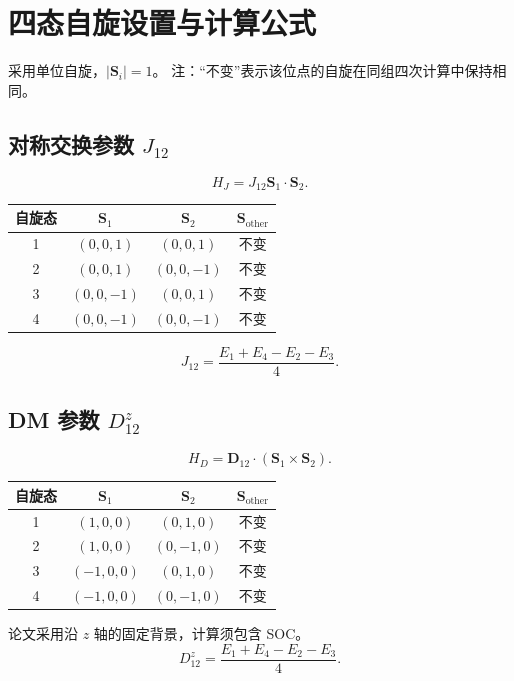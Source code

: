 \documentclass[openany]{book}
\theoremstyle{mydefinition}
\theoremstyle{myplain}
\renewcommand{\arraystretch}{1.4}
\newcommand{\Sother}{\mathbf S_{\mathrm{other}}}
\begin{document}
\clearpage
\begingroup
\renewcommand{\arraystretch}{1.12}
\setlength{\abovedisplayskip}{5pt}
\setlength{\belowdisplayskip}{5pt}
\setlength{\abovedisplayshortskip}{3pt}
\setlength{\belowdisplayshortskip}{3pt}
\setlength{\topsep}{3pt}
\titlespacing*{\subsection}{0pt}{0.4em}{0.2em}
\noindent\begin{minipage}{\textwidth}
\section{四态自旋设置与计算公式}

采用单位自旋，\(|\mathbf S_i|=1\)。
注：“不变”表示该位点的自旋在同组四次计算中保持相同。

\noindent\begin{minipage}{\textwidth}
\subsection{对称交换参数 \(J_{12}\)}
\[
H_J=J_{12}\mathbf S_1\cdot\mathbf S_2.
\]
\begin{center}
\begin{tabular}{cccc}
\toprule
自旋态 & \(\mathbf S_1\) & \(\mathbf S_2\) & \(\Sother\) \\ \midrule
1 & \((0,0,1)\)  & \((0,0,1)\)  & 不变 \\
2 & \((0,0,1)\)  & \((0,0,-1)\) & 不变 \\
3 & \((0,0,-1)\) & \((0,0,1)\)  & 不变 \\
4 & \((0,0,-1)\) & \((0,0,-1)\) & 不变 \\
\bottomrule
\end{tabular}
\end{center}
\[
J_{12}=\frac{E_1+E_4-E_2-E_3}{4}.
\]
\end{minipage}
\par\medskip

\noindent\begin{minipage}{\textwidth}
\subsection{DM 参数 \(D_{12}^{z}\)}
\[
H_D=\mathbf D_{12}\cdot(\mathbf S_1\times\mathbf S_2).
\]
\begin{center}
\begin{tabular}{cccc}
\toprule
自旋态 & \(\mathbf S_1\) & \(\mathbf S_2\) & \(\Sother\) \\ \midrule
1 & \((1,0,0)\)  & \((0,1,0)\)  & 不变 \\
2 & \((1,0,0)\)  & \((0,-1,0)\) & 不变 \\
3 & \((-1,0,0)\) & \((0,1,0)\)  & 不变 \\
4 & \((-1,0,0)\) & \((0,-1,0)\) & 不变 \\
\bottomrule
\end{tabular}
\end{center}
论文采用沿 \(z\) 轴的固定背景，计算须包含 SOC。
\[
D_{12}^{z}=\frac{E_1+E_4-E_2-E_3}{4}.
\]
\end{minipage}
\par\medskip


\end{minipage}
\end{document}
